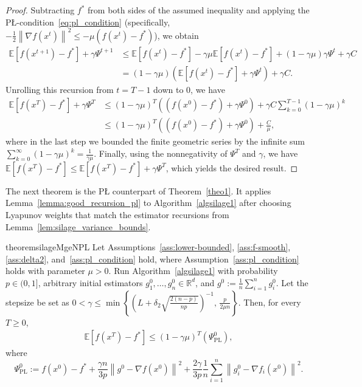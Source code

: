 \documentclass{article}
\newcommand{\bb}{\mathbb}
\newcommand{\R}{\bb R}
\newcommand{\sqn}[1]{\left\| #1 \right\|^2}
\newcommand{\nf}[1]{\nabla f\rb{#1}}
\newcommand{\fstar}{f^*}
\newcommand{\eqdef}{:=}
\newcommand{\Exp}[1]{{\bb E}\left[#1\right]}
\newcommand{\rb}[1]{\left(#1\right)}
\newcommand {\rbl}[1]{(#1)} %
\renewcommand{\nf}[1]{\nabla f\rbl{#1}}
\newcommand{\nfi}[1]{\nabla f_i\rbl{#1}}
\theoremstyle{plain}
\begin{document}
\begin{proof}
    Subtracting $\fstar$ from both sides of the assumed inequality and applying the P\L-condition~\eqref{eq:pl_condition} (specifically, $-\frac{1}{2}\sqn{\nabla f(x^t)} \leq -\mu(f(x^t) - \fstar)$), we obtain
    \begin{align*}
        \Exp{f(x^{t+1}) - \fstar} + \gamma \Psi^{t+1} 
        &\leq \Exp{f(x^t) - \fstar} - \gamma\mu\Exp{f(x^t)-\fstar} + (1 - \gamma \mu)\gamma \Psi^{t} + \gamma C \\
        &= (1 - \gamma \mu)\left(\Exp{f(x^t) - \fstar} + \gamma \Psi^{t}\right) + \gamma C.
    \end{align*}
    Unrolling this recursion from $t=T-1$ down to $0$, we have
    \begin{align*}
        \Exp{f(x^{T}) - \fstar} + \gamma \Psi^{T} 
        &\leq (1 - \gamma \mu)^{T}\left((f(x^0) - \fstar) + \gamma \Psi^{0}\right) + \gamma C \sum_{k = 0}^{T-1} (1 - \gamma \mu)^k \\
        &\leq (1 - \gamma \mu)^{T}\left((f(x^0) - \fstar) + \gamma \Psi^{0}\right) + \frac{C}{\mu},
    \end{align*}
    where in the last step we bounded the finite geometric series by the infinite sum $\sum_{k=0}^\infty (1-\gamma\mu)^k = \frac{1}{\gamma\mu}$.
    Finally, using the nonnegativity of $\Psi^{T}$ and $\gamma$, we have $\Exp{f(x^{T}) - \fstar} \leq \Exp{f(x^{T}) - \fstar} + \gamma \Psi^{T}$, which yields the desired result.
\end{proof}

The next theorem is the P\L{} counterpart of Theorem~\ref{theo1}.
It applies Lemma~\ref{lemma:good_recursion_pl} to Algorithm~\ref{algsilage1} after choosing Lyapunov weights that match the estimator recursions from Lemma~\ref{lem:silage_variance_bounds}.

\begin{restatable}{theorem}{silageMgeNPL}
\label{theo:silage_pl}
Let Assumptions~\ref{ass:lower-bounded}, \ref{ass:f-smooth}, \ref{ass:delta2}, and~\ref{ass:pl_condition} hold,
where Assumption~\ref{ass:pl_condition} holds with parameter $\mu>0$.
Run Algorithm~\ref{algsilage1} with probability $p\in(0,1]$, arbitrary initial estimators
$g_1^0,\ldots,g_n^0\in\R^d$, and $g^0\eqdef \frac1n\sum_{i=1}^n g_i^0$.
Let the stepsize be set as
$0<\gamma\le \min\left\{\rb{L+\delta_2\sqrt{\frac{2(n-p)}{np}}}^{-1},\,\frac{p}{2\mu n}\right\}$.
Then, for every $T\ge 0$,
\begin{align}
\Exp{f(x^T)-\fstar}
\le
(1-\gamma\mu)^T\rb{\Psi_{\mathrm{PL}}^0},
\label{eq:silage_pl_rate}
\end{align}
where
\begin{equation*}
\Psi_{\mathrm{PL}}^0
\eqdef
f(x^0)-\fstar
+\frac{\gamma n}{3p}\sqn{g^0-\nf{x^0}}
+\frac{2\gamma}{3p}\frac1n\sum_{i=1}^n\sqn{g_i^0-\nfi{x^0}}.
\end{equation*}
\end{restatable}
\end{document}
